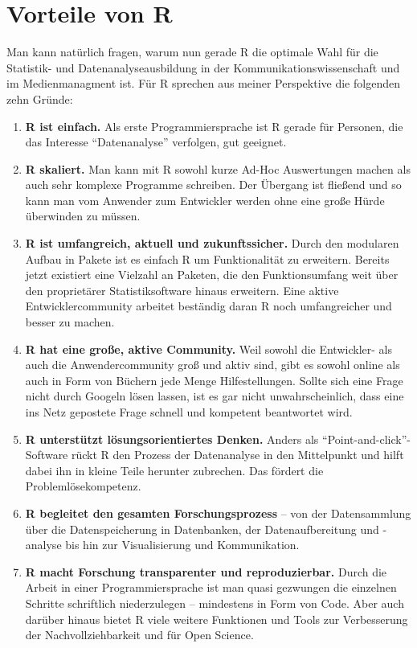 \documentclass[
]{book}
\begin{document}
\hypertarget{vorteile-von-r}{%
\section{Vorteile von R}\label{vorteile-von-r}}

Man kann natürlich fragen, warum nun gerade R die optimale Wahl für die Statistik- und Datenanalyseausbildung in der Kommunikationswissenschaft und im Medienmanagment ist. Für R sprechen aus meiner Perspektive die folgenden zehn Gründe:

\begin{enumerate}
\def\labelenumi{\arabic{enumi}.}
\item
  \textbf{R ist einfach.} Als erste Programmiersprache ist R gerade für Personen, die das Interesse ``Datenanalyse'' verfolgen, gut geeignet.
\item
  \textbf{R skaliert.} Man kann mit R sowohl kurze Ad-Hoc Auswertungen machen als auch sehr komplexe Programme schreiben. Der Übergang ist fließend und so kann man vom Anwender zum Entwickler werden ohne eine große Hürde überwinden zu müssen.
\item
  \textbf{R ist umfangreich, aktuell und zukunftssicher.} Durch den modularen Aufbau in Pakete ist es einfach R um Funktionalität zu erweitern. Bereits jetzt existiert eine Vielzahl an Paketen, die den Funktionsumfang weit über den proprietärer Statistiksoftware hinaus erweitern. Eine aktive Entwicklercommunity arbeitet beständig daran R noch umfangreicher und besser zu machen.
\item
  \textbf{R hat eine große, aktive Community.} Weil sowohl die Entwickler- als auch die Anwendercommunity groß und aktiv sind, gibt es sowohl online als auch in Form von Büchern jede Menge Hilfestellungen. Sollte sich eine Frage nicht durch Googeln lösen lassen, ist es gar nicht unwahrscheinlich, dass eine ins Netz gepostete Frage schnell und kompetent beantwortet wird.
\item
  \textbf{R unterstützt lösungsorientiertes Denken.} Anders als ``Point-and-click''-Software rückt R den Prozess der Datenanalyse in den Mittelpunkt und hilft dabei ihn in kleine Teile herunter zubrechen. Das fördert die Problemlösekompetenz.
\item
  \textbf{R begleitet den gesamten Forschungsprozess} -- von der Datensammlung über die Datenspeicherung in Datenbanken, der Datenaufbereitung und -analyse bis hin zur Visualisierung und Kommunikation.
\item
  \textbf{R macht Forschung transparenter und reproduzierbar.} Durch die Arbeit in einer Programmiersprache ist man quasi gezwungen die einzelnen Schritte schriftlich niederzulegen -- mindestens in Form von Code. Aber auch darüber hinaus bietet R viele weitere Funktionen und Tools zur Verbesserung der Nachvollziehbarkeit und für Open Science.

\end{enumerate}
\end{document}
